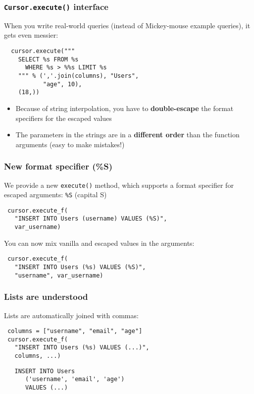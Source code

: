 \documentclass{beamer}
\begin{document}
\begin{frame}[fragile]
  \frametitle{\texttt{Cursor.execute()} interface}

  When you write real-world queries (instead of Mickey-mouse example
  queries), it gets even messier:
\begin{verbatim}
  cursor.execute("""
    SELECT %s FROM %s 
      WHERE %s > %%s LIMIT %s
    """ % (','.join(columns), "Users", 
           "age", 10),
    (18,))
\end{verbatim}

\begin{itemize}
\item Because of string interpolation, you have to \textbf{double-escape} the
  format specifiers for the escaped values
\item The parameters in the strings are in a \textbf{different order} than the
  function arguments (easy to make mistakes!)
\end{itemize}

\end{frame}




\begin{frame}[fragile]
  \frametitle{New format specifier (\%S)}

  We provide a new \texttt{execute()} method, which supports a format specifier
  for escaped arguments: \texttt{\%S} (capital S)

\begin{verbatim}
 cursor.execute_f(
   "INSERT INTO Users (username) VALUES (%S)",
   var_username)
\end{verbatim}

  You can now mix vanilla and escaped values in the arguments:
\begin{verbatim}
 cursor.execute_f(
   "INSERT INTO Users (%s) VALUES (%S)",
   "username", var_username)
\end{verbatim}

\end{frame}



\begin{frame}[fragile]
  \frametitle{Lists are understood}

  Lists are automatically joined with commas:
\begin{verbatim}
 columns = ["username", "email", "age"]
 cursor.execute_f(
   "INSERT INTO Users (%s) VALUES (...)",
   columns, ...)
\end{verbatim}

\vfill
\begin{verbatim}
   INSERT INTO Users 
      ('username', 'email', 'age') 
      VALUES (...)
\end{verbatim}
\vfill

\end{frame}
\end{document}
